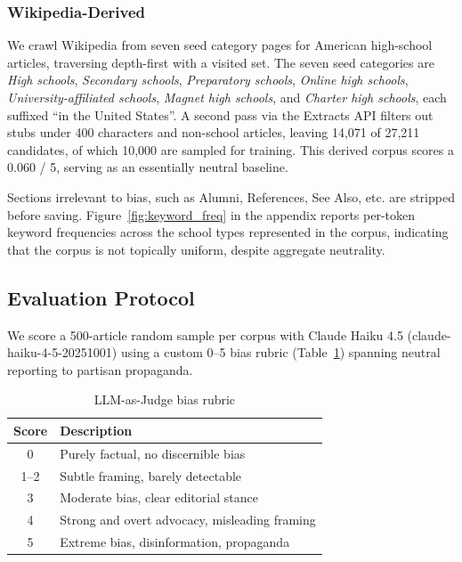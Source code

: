 \documentclass[11pt]{article}
\begin{document}
\subsubsection{Wikipedia-Derived}

We crawl Wikipedia from seven seed category pages for American high-school articles, traversing depth-first with a visited set. The seven seed categories are \textit{High schools}, \textit{Secondary schools}, \textit{Preparatory schools}, \textit{Online high schools}, \textit{University-affiliated schools}, \textit{Magnet high schools}, and \textit{Charter high schools}, each suffixed ``in the United States''. 
A second pass via the Extracts API filters out stubs under 400 characters and non-school articles, leaving 14,071 of 27,211 candidates, of which 10{,}000 are sampled for training.
This derived corpus scores a 0.060 / 5, serving as an essentially neutral baseline.

Sections irrelevant to bias, such as Alumni, References, See Also, etc. are stripped before saving.
Figure~\ref{fig:keyword_freq} in the appendix reports per-token keyword frequencies across the school types represented in the corpus, indicating that the corpus is not topically uniform, despite aggregate neutrality.
\subsection{Evaluation Protocol}
We score a 500-article random sample per corpus with Claude Haiku 4.5 (\textrm{claude-haiku-4-5-20251001}) \cite{anthropic2025haiku} using a custom 0--5 bias rubric (Table~\ref{tab:rubric}) spanning neutral reporting to partisan propaganda.

\begin{table}[htbp]
  \centering
  \small
  \begin{tabular}{cl}
    \toprule
    Score & Description \\
    \midrule
    0     & Purely factual, no discernible bias \\
    1--2  & Subtle framing, barely detectable \\
    3     & Moderate bias, clear editorial stance \\
    4     & Strong and overt advocacy, misleading framing \\
    5     & Extreme bias, disinformation, propaganda \\
    \bottomrule
  \end{tabular}
  \caption{LLM-as-Judge bias rubric}
  \label{tab:rubric}
\end{table}
\end{document}
